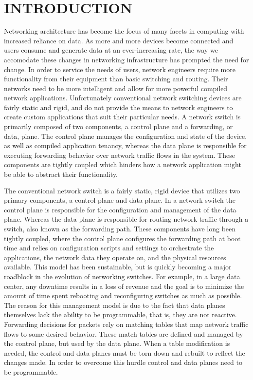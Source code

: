 \chapter{INTRODUCTION}
\label{intro}





Networking architecture has become the focus of many facets in computing
with increased reliance on data. As more and more devices become connected
and users consume and generate data at an ever-increasing rate, the way we
accomodate these changes in networking infrastructure has prompted the need
for change. In order to service the needs of users, network engineers require
more functionality from their equipment than basic switching and routing. Their
networks need to be more intelligent and allow for more powerful compiled network
applications. Unfortunately conventional network switching devices are fairly
static and rigid, and do not provide the means to network engineers to create
custom applications that suit their particular needs. A network switch is
primarily composed of two components, a control plane and a forwarding, or
data, plane. The control plane manages the configuration and state of the device,
as well as compiled application tenancy, whereas the data plane is responsible
for executing forwarding behavior over network traffic flows in the system. These
components are tightly coupled which hinders how a network application might
be able to abstract their functionality.

The conventional network switch is a fairly static, rigid device
that utilizes two primary components, a control plane and data plane. In a
network switch the control plane is responsible for the configuration and
management of the data plane. Whereas the data plane is responsible for routing
network traffic through a switch, also known as the forwarding path. These
components have long been tightly coupled, where the control plane configures
the forwarding path at boot time and relies on configuration scripts and
settings to orchestrate the applications, the network data they operate on,
and the physical resources available. This model has been sustainable, but is
quickly becoming a major roadblock in the evolution of networking switches.
For example, in a large data center, any downtime results in a loss of revenue
and the goal is to minimize the amount of time spent rebooting and
reconfiguring switches as much as possible. The reason for this management
model is due to the fact that data planes themselves lack the ability to be
programmable, that is, they are not reactive. Forwarding decisions for packets
rely on matching tables that map network traffic flows to some desired
behavior. These match tables are defined and managed by the control plane, but
used by the data plane. When a table modification is needed, the control and
data planes must be torn down and rebuilt to reflect the changes made. In
order to overcome this hurdle control and data planes need to be programmable.

